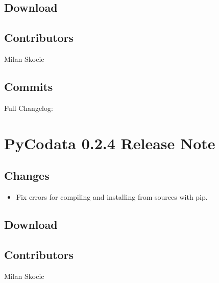 \documentclass[a4paper,10pt,english]{sphinxmanual}
\begin{document}
\subsection{Download}
\label{\detokenize{releases/0.2.5-notes:download}}
\sphinxAtStartPar
{}


\subsection{Contributors}
\label{\detokenize{releases/0.2.5-notes:contributors}}
\sphinxAtStartPar
Milan Skocic


\subsection{Commits}
\label{\detokenize{releases/0.2.5-notes:commits}}
\sphinxAtStartPar
Full Changelog: 

\sphinxstepscope


\section{PyCodata 0.2.4 Release Note}
\label{\detokenize{releases/0.2.4-notes:pycodata-0-2-4-release-note}}\label{\detokenize{releases/0.2.4-notes::doc}}

\subsection{Changes}
\label{\detokenize{releases/0.2.4-notes:changes}}\begin{itemize}
\item {} 
\sphinxAtStartPar
Fix errors for compiling and installing from sources with pip.

\end{itemize}


\subsection{Download}
\label{\detokenize{releases/0.2.4-notes:download}}
\sphinxAtStartPar
{}


\subsection{Contributors}
\label{\detokenize{releases/0.2.4-notes:contributors}}
\sphinxAtStartPar
Milan Skocic
\end{document}

